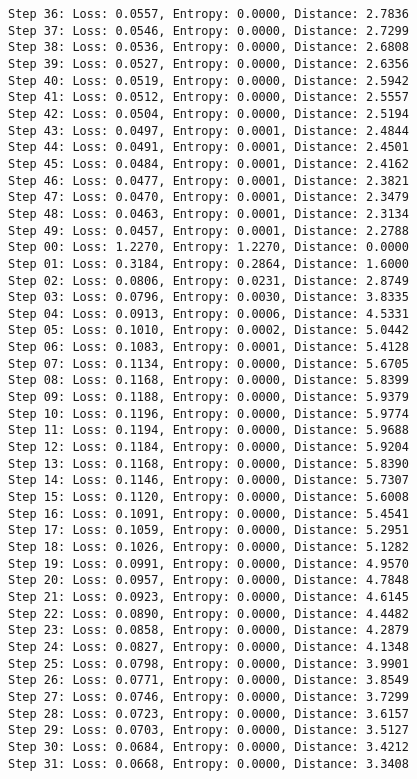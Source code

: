 \documentclass[11pt]{article}
\begin{document}
\begin{Verbatim}[commandchars=\\\{\}]
Step 36: Loss: 0.0557, Entropy: 0.0000, Distance: 2.7836
Step 37: Loss: 0.0546, Entropy: 0.0000, Distance: 2.7299
Step 38: Loss: 0.0536, Entropy: 0.0000, Distance: 2.6808
Step 39: Loss: 0.0527, Entropy: 0.0000, Distance: 2.6356
Step 40: Loss: 0.0519, Entropy: 0.0000, Distance: 2.5942
Step 41: Loss: 0.0512, Entropy: 0.0000, Distance: 2.5557
Step 42: Loss: 0.0504, Entropy: 0.0000, Distance: 2.5194
Step 43: Loss: 0.0497, Entropy: 0.0001, Distance: 2.4844
Step 44: Loss: 0.0491, Entropy: 0.0001, Distance: 2.4501
Step 45: Loss: 0.0484, Entropy: 0.0001, Distance: 2.4162
Step 46: Loss: 0.0477, Entropy: 0.0001, Distance: 2.3821
Step 47: Loss: 0.0470, Entropy: 0.0001, Distance: 2.3479
Step 48: Loss: 0.0463, Entropy: 0.0001, Distance: 2.3134
Step 49: Loss: 0.0457, Entropy: 0.0001, Distance: 2.2788
Step 00: Loss: 1.2270, Entropy: 1.2270, Distance: 0.0000
Step 01: Loss: 0.3184, Entropy: 0.2864, Distance: 1.6000
Step 02: Loss: 0.0806, Entropy: 0.0231, Distance: 2.8749
Step 03: Loss: 0.0796, Entropy: 0.0030, Distance: 3.8335
Step 04: Loss: 0.0913, Entropy: 0.0006, Distance: 4.5331
Step 05: Loss: 0.1010, Entropy: 0.0002, Distance: 5.0442
Step 06: Loss: 0.1083, Entropy: 0.0001, Distance: 5.4128
Step 07: Loss: 0.1134, Entropy: 0.0000, Distance: 5.6705
Step 08: Loss: 0.1168, Entropy: 0.0000, Distance: 5.8399
Step 09: Loss: 0.1188, Entropy: 0.0000, Distance: 5.9379
Step 10: Loss: 0.1196, Entropy: 0.0000, Distance: 5.9774
Step 11: Loss: 0.1194, Entropy: 0.0000, Distance: 5.9688
Step 12: Loss: 0.1184, Entropy: 0.0000, Distance: 5.9204
Step 13: Loss: 0.1168, Entropy: 0.0000, Distance: 5.8390
Step 14: Loss: 0.1146, Entropy: 0.0000, Distance: 5.7307
Step 15: Loss: 0.1120, Entropy: 0.0000, Distance: 5.6008
Step 16: Loss: 0.1091, Entropy: 0.0000, Distance: 5.4541
Step 17: Loss: 0.1059, Entropy: 0.0000, Distance: 5.2951
Step 18: Loss: 0.1026, Entropy: 0.0000, Distance: 5.1282
Step 19: Loss: 0.0991, Entropy: 0.0000, Distance: 4.9570
Step 20: Loss: 0.0957, Entropy: 0.0000, Distance: 4.7848
Step 21: Loss: 0.0923, Entropy: 0.0000, Distance: 4.6145
Step 22: Loss: 0.0890, Entropy: 0.0000, Distance: 4.4482
Step 23: Loss: 0.0858, Entropy: 0.0000, Distance: 4.2879
Step 24: Loss: 0.0827, Entropy: 0.0000, Distance: 4.1348
Step 25: Loss: 0.0798, Entropy: 0.0000, Distance: 3.9901
Step 26: Loss: 0.0771, Entropy: 0.0000, Distance: 3.8549
Step 27: Loss: 0.0746, Entropy: 0.0000, Distance: 3.7299
Step 28: Loss: 0.0723, Entropy: 0.0000, Distance: 3.6157
Step 29: Loss: 0.0703, Entropy: 0.0000, Distance: 3.5127
Step 30: Loss: 0.0684, Entropy: 0.0000, Distance: 3.4212
Step 31: Loss: 0.0668, Entropy: 0.0000, Distance: 3.3408

\end{Verbatim}
\end{document}
